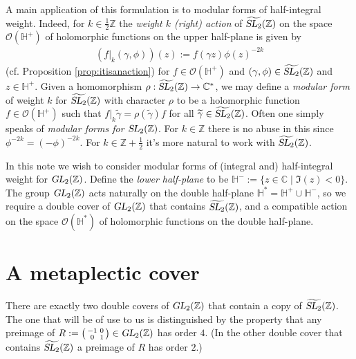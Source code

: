 \documentclass[aps,prd,groupedaddress,preprint,tightenlines,eqsecnum,nofootinbib]{revtex4}
\newcommand{\g}{\gamma}
\newcommand{\SL}{\operatorname{\textsl{SL}}}      %
\newcommand{\GL}{\operatorname{\textsl{GL}}}      %
\newcommand{\C}{{\mathbb C}}%
\newcommand{\Z}{{\mathbb Z}}%
\newcommand{\HH}{{\mathbb H}}%
\newcommand{\WT}{\widetilde}
\newcommand{\OO}{\mathcal{O}}
\begin{document}
A main application of this formulation is to modular forms of half-integral weight. Indeed, for $k\in \frac12\Z$ the {\em weight $k$ (right) action} of $\widetilde{\SL_2}(\Z)$ on the space $\OO(\HH^+)$ of holomorphic functions on the upper half-plane is given by
\begin{align}
\label{eqn:fplustildegamma}
	(f|_k(\g,\phi))(z) := f(\g z)\phi(z)^{-2k}
\end{align}
(cf. Proposition \ref{prop:itisanaction}) for $f\in \OO(\HH^+)$ and $(\g,\phi)\in \widetilde{\SL_2}(\Z)$ and $z\in \HH^+$. 
Given a homomorphism $\rho:\widetilde{\SL_2}(\Z)\to \C^*$, we may define a {\em modular form} of weight $k$ for $\widetilde{\SL_2}(\Z)$ with character $\rho$ to be a holomorphic function $f\in\OO(\HH^+)$ such that $f|_k\WT\g=\rho(\WT\g)f$ for all $\WT\g\in \widetilde{\SL_2}(\Z)$. 
Often one simply speaks of {\em modular forms for $\SL_2(\Z)$}. For $k\in \Z$ there is no abuse in this since $\phi^{-2k}=(-\phi)^{-2k}$. For $k\in \Z+\frac12$ it's more natural to work with $\widetilde{\SL_2}(\Z)$.

In this note we wish to consider modular forms of (integral and) half-integral weight for $\GL_2(\Z)$. Define the {\em lower half-plane} to be $\HH^-:=\{z\in \C\mid \Im(z)<0\}$. The group $\GL_2(\Z)$ acts naturally on the {double half-plane} $\HH^*=\HH^+\cup\HH^-$, so we require a double cover of $\GL_2(\Z)$ that contains $\widetilde{\SL_2}(\Z)$, and a compatible action on the space $\OO(\HH^*)$ of holomorphic functions on the double half-plane. 

\section{A metaplectic cover}
\label{sec:metcvrgl2}


There are exactly two double covers of $\GL_2(\Z)$ that contain a copy of $\widetilde{\SL_2}(\Z)$. The one that will be of use to us is distinguished by the property that any preimage of $R:=\left(\begin{smallmatrix}-1&0\\0&1\end{smallmatrix}\right)\in \GL_2(\Z)$ has order $4$. (In the other double cover that contains $\widetilde{\SL_2}(\Z)$ a preimage of $R$ has order $2$.) 
\end{document}
